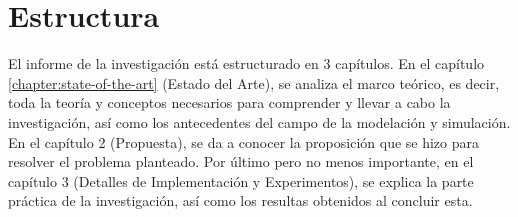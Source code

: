 \section*{Estructura}
El informe de la investigación está estructurado en 3 capítulos. En el capítulo \ref{chapter:state-of-the-art} (Estado del Arte), se analiza el marco teórico, es decir, toda la teoría y conceptos necesarios para comprender y llevar a cabo la investigación, así como los antecedentes del campo de la modelación y simulación. En el capítulo 2 (Propuesta), se da a conocer la proposición que se hizo para resolver el problema planteado. Por último pero no menos importante, en el capítulo 3 (Detalles de Implementación y Experimentos), se explica la parte práctica de la investigación, así como los resultas obtenidos al concluir esta.